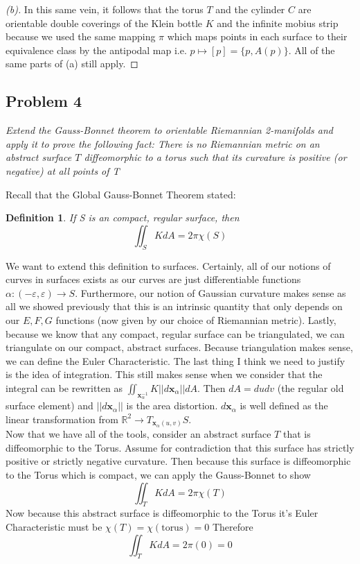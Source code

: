 \documentclass[a4paper, 11pt]{article}
\newtheorem*{definition}{Definition}
\newcommand{\R}{\mathbb{R}}
\begin{document}
	\begin{proof}[(b)]
		In this same vein, it follows that the torus $T$ and the cylinder $C$ are orientable double coverings of the Klein bottle $K$ and the infinite mobius strip because we used the same mapping $\pi$ which maps points in each surface to their equivalence class by the antipodal map i.e. $p\mapsto [p] = \{p, A(p)\}$. All of the same parts of (a) still apply. 	
	\end{proof}

\subsection*{Problem 4} 
	\textit{Extend the Gauss-Bonnet theorem to orientable Riemannian 2-manifolds and apply it to prove the following fact: There is no Riemannian metric on an abstract surface $T$ diffeomorphic to a torus such that its curvature is positive (or negative) at all points of T }

	Recall that the Global Gauss-Bonnet Theorem stated:
		\begin{definition}
			If S is an compact, regular surface, then	
				\begin{equation*}
					\iint_S KdA = 2\pi\chi(S)
				\end{equation*}
		\end{definition}
		
	\noindent We want to extend this definition to surfaces. Certainly, all of our notions of curves in surfaces exists as our curves are just differentiable functions $\alpha:(-\varepsilon, \varepsilon) \to S $. Furthermore, our notion of Gaussian curvature makes sense as all we showed previously that this is an intrinsic quantity that only depends on our $E, F, G$ functions (now given by our choice of Riemannian metric). Lastly, because we know that any compact, regular surface can be triangulated, we can triangulate on our compact, abstract surfaces. Because triangulation makes sense, we can define the Euler Characteristic. The last thing I think we need to justify is the idea of integration. This still makes sense when we consider that the integral can be rewritten as $\iint_{\mathbf{x}_\alpha^{-1}}K||d\mathbf{x}_\alpha||dA$. Then $dA = dudv$ (the regular old surface element) and $||d\mathbf{x}_\alpha||$ is the area distortion. $d\mathbf{x}_\alpha$ is well defined as the linear transformation from $\R^2 \to T_{\mathbf{x}_\alpha(u,v)}S$. \\ 
	
	\noindent Now that we have all of the tools, consider an abstract surface $T$ that is diffeomorphic to the Torus. Assume for contradiction that this surface has strictly positive or strictly negative curvature. Then because this surface is diffeomorphic to the Torus which is compact, we can apply the Gauss-Bonnet to show
		\begin{equation}
			\iint_T K dA = 2\pi\chi(T)
		\end{equation}
	\noindent Now because this abstract surface is diffeomorphic to the Torus it's Euler Characteristic must be $\chi(T) = \chi(\text{torus}) = 0$ Therefore
		\begin{equation*}
			\iint_T K dA = 2\pi(0) = 0 
		\end{equation*}
\end{document}
